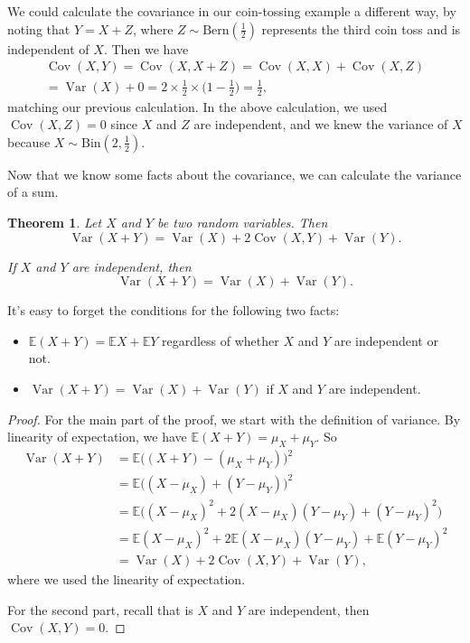 \documentclass[
  a4paper,
]{book}
\providecommand{\tightlist}{%
  \setlength{\itemsep}{0pt}\setlength{\parskip}{0pt}}
\newtheorem{theorem}{Theorem}[chapter]
\theoremstyle{definition}
\theoremstyle{definition}
\theoremstyle{definition}
\theoremstyle{definition}
\theoremstyle{remark}
\begin{document}
We could calculate the covariance in our coin-tossing example a different way, by noting that \(Y = X + Z\), where \(Z \sim \text{Bern}(\frac12)\) represents the third coin toss and is independent of \(X\). Then we have
\begin{multline*}
\operatorname{Cov}(X,Y) = \operatorname{Cov}(X, X + Z) = \operatorname{Cov}(X, X) + \operatorname{Cov}(X, Z) \\
= \operatorname{Var}(X) + 0 = 2 \times \tfrac12 \times \big(1 - \tfrac12\big) = \tfrac12, \end{multline*}
matching our previous calculation. In the above calculation, we used \(\operatorname{Cov}(X, Z) = 0\) since \(X\) and \(Z\) are independent, and we knew the variance of \(X\) because \(X \sim \text{Bin}(2, \frac12)\).

Now that we know some facts about the covariance, we can calculate the variance of a sum.

\begin{theorem}
Let \(X\) and \(Y\) be two random variables. Then
\[ \operatorname{Var}(X + Y) = \operatorname{Var}(X) + 2\operatorname{Cov}(X,Y) + \operatorname{Var}(Y) . \]

If \(X\) and \(Y\) are independent, then
\[ \operatorname{Var}(X + Y) = \operatorname{Var}(X) + \operatorname{Var}(Y) . \]
\end{theorem}

It's easy to forget the conditions for the following two facts:

\begin{itemize}
\tightlist
\item
  \(\mathbb E(X + Y) = \mathbb EX + \mathbb EY\) regardless of whether \(X\) and \(Y\) are independent or not.
\item
  \(\operatorname{Var}(X+Y) = \operatorname{Var}(X) + \operatorname{Var}(Y)\) if \(X\) and \(Y\) are independent.
\end{itemize}

\begin{proof}
For the main part of the proof, we start with the definition of variance. By linearity of expectation, we have \(\mathbb E(X + Y) = \mu_X + \mu_Y\). So
\begin{align*}
\operatorname{Var}(X + Y) &= \mathbb E\big((X + Y) - (\mu_X + \mu_Y)\big)^2 \\
  &= \mathbb E \big((X - \mu_X) + (Y - \mu_Y) \big)^2 \\
  &= \mathbb E \big( (X - \mu_X)^2 + 2(X - \mu_X)(Y - \mu_Y) + (Y - \mu_Y)^2\big) \\
  &= \mathbb E(X - \mu_X)^2 + 2 \mathbb E(X - \mu_X)(Y - \mu_Y) + \mathbb E (Y - \mu_Y)^2 \\
  &= \operatorname{Var}(X) + 2\operatorname{Cov}(X,Y) + \operatorname{Var}(Y) ,
\end{align*}
where we used the linearity of expectation.

For the second part, recall that is \(X\) and \(Y\) are independent, then \(\operatorname{Cov}(X,Y) = 0\).
\end{proof}
\end{document}
